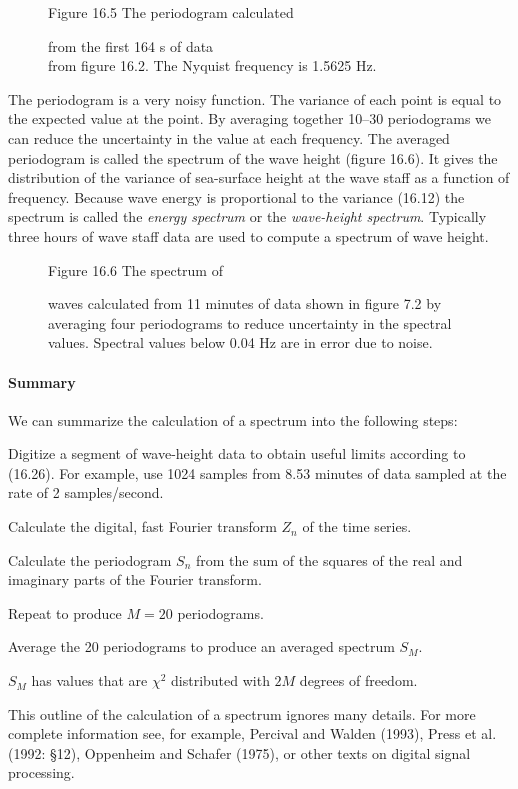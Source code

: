 \begin{figure}[t!]
\footnotesize
\centering
Figure 16.5 The periodogram calculated \rule{0mm}{3ex}from the first
164 s of data\\from figure 16.2. The Nyquist frequency is 1.5625 Hz.
\label{fig:periodogram}
\vspace{-3ex}
\end{figure}

The periodogram is a very noisy function. The variance of each point
is equal to the expected value at the point. By averaging together
10--30 periodograms we can reduce the uncertainty in the value at each
frequency. The averaged periodogram is called the spectrum of the wave
height (figure 16.6). It gives the distribution of the variance of
sea-surface height at the wave staff as a function of
frequency. Because wave energy is proportional to the variance (16.12)
the spectrum is called the \textit{energy
  spectrum} or the
\textit{wave-height
  spectrum}. Typically three
hours of wave staff data are used to compute a spectrum of wave
height.

\begin{figure}[t!]
\footnotesize
Figure 16.6 The spectrum of \rule{0mm}{4ex}waves calculated from 11
minutes of data shown in figure 7.2 by averaging four periodograms to
reduce uncertainty in the spectral values. Spectral values below 0.04
Hz are in error due to noise.
\label{fig:wavespectrum}
\vspace{-3ex}
\end{figure}

\paragraph{Summary}
We can summarize the calculation of a spectrum into the following
steps:
\begin{enumerate}
\vitem Digitize a segment of wave-height data to obtain useful limits
according to (16.26). For example, use 1024 samples from 8.53 minutes
of data sampled at the rate of 2 samples/second.

\vitem Calculate the digital, fast Fourier transform $Z_{n}$ of the
time series.

\vitem Calculate the periodogram $S_{n}$ from the sum of the squares
of the real and imaginary parts of the Fourier transform.

\vitem Repeat to produce $M=20$ periodograms.

\vitem Average the 20 periodograms to produce an averaged spectrum
$S_{M}$.

\vitem $S_{M}$ has values that are $\chi ^{2}$ distributed with $2 M$
degrees of freedom.
\end{enumerate}
This outline of the calculation of a spectrum ignores many
details. For more complete information see, for example, Percival and
Walden (1993), Press et al.  (1992: \S 12), Oppenheim and Schafer
(1975), or other texts on digital signal processing.

